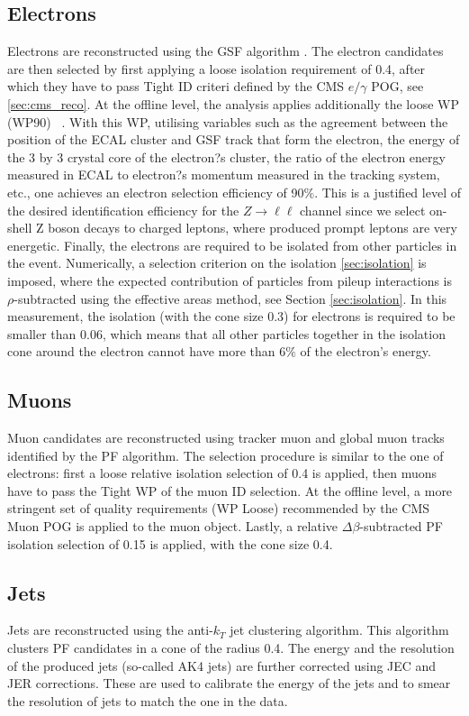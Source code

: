 \subsection{Electrons}\label{sec:electrons}
Electrons are reconstructed using the GSF algorithm \cite{GSF}. The electron candidates are then selected by first applying a loose isolation requirement of 0.4, after which they have to pass Tight ID criteri defined by the CMS $e/\gamma$ POG, see \ref{sec:cms_reco}. At the offline level, the analysis applies additionally the loose WP (WP90)  ~\cite{vhbbAN}. With this WP, utilising variables such as the agreement between the position of the ECAL cluster and GSF track that form the electron, the energy of the 3 by 3 crystal core of the electron?s cluster, the ratio of the electron energy measured in ECAL to electron?s momentum measured in the tracking system, etc., one achieves an electron selection efficiency of 90$\%$. This is a justified level of the desired identification efficiency for the $Z \to \ell \ell$ channel since we select on-shell Z boson decays to charged leptons, where produced prompt leptons are very energetic. Finally, the electrons are required to be isolated from other particles in the event. Numerically, a selection criterion on the isolation \ref{sec:isolation} is  imposed, where the expected contribution of particles from pileup interactions is $\rho$-subtracted using the effective areas method, see Section \ref{sec:isolation}. In this measurement, the isolation (with the cone size 0.3) for electrons is required to be smaller than 0.06, which means that all other particles together in the isolation cone around the electron cannot have more than 6$\%$ of the electron's energy.

\subsection{Muons}\label{sec:muons}
Muon candidates are reconstructed using tracker muon and global muon tracks identified by the PF algorithm. The selection procedure is similar to the one of electrons: first a loose relative isolation selection of 0.4 is applied, then muons have to pass the Tight WP of the muon ID selection. 
At the offline level, a more stringent set of quality requirements (WP Loose) recommended by the CMS Muon POG is applied to the muon object.
Lastly, a relative $\Delta\beta$-subtracted PF isolation selection of 0.15 is applied, with the cone size 0.4.

\subsection{Jets}\label{sec:jets}
Jets are reconstructed using the anti-$k_T$ jet clustering algorithm. This algorithm clusters PF candidates in a cone of the radius 0.4. The energy and the resolution of the produced jets (so-called AK4 jets) are further corrected using JEC and JER corrections. These are used to calibrate the energy of the jets and to smear the resolution of jets to match the one in the data. 

